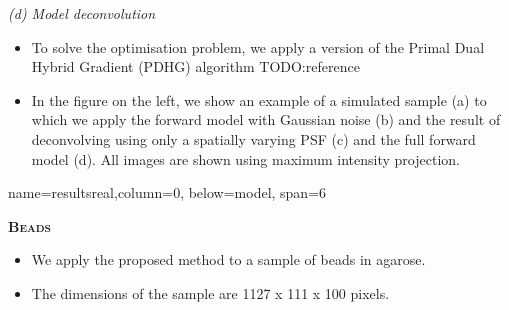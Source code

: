 \documentclass[a0paper,portrait,fontscale=0.35]{baposter}
\newcommand{\mycaption}[1]{
  {
    \smaller
    \emph{#1}
  }
}
\theoremstyle{plain}
\theoremstyle{plain}
\theoremstyle{definition}
\theoremstyle{plain}
\theoremstyle{definition}
\begin{document}
\begin{poster}
{\begin{minipage}[t]{0.55\textwidth}
\begin{minipage}[t]{0.49\textwidth}
        \vspace{0.3em}
        \mycaption{
          (d) Model deconvolution
        }
      \end{minipage}
    \end{minipage}
    \hspace{-0.5em}
    \begin{minipage}[t]{0.45\textwidth}
      \begin{itemize}
        \item To solve the optimisation problem, we apply a version
          of the Primal Dual Hybrid Gradient (PDHG) algorithm TODO:reference

        \item In the figure on the left, we show an example of a simulated sample (a) 
          to which we apply the forward model with Gaussian noise (b)
          and the result of deconvolving using only a spatially varying
          PSF (c) and the full forward model (d). All images are shown 
          using maximum intensity projection.
      \end{itemize}
    \end{minipage}
}

{name=resultsreal,column=0, below=model, span=6}{
  \begin{minipage}[t]{0.51\textwidth} 
    \begin{center}
      \larger
      \textbf{\textsc{Beads}}
    \end{center}

   \hspace{-2em}
    \begin{minipage}[t]{0.49\textwidth}
      \begin{itemize}
        \item We apply the proposed method to a sample of 
          beads in agarose.
        \item The dimensions of the sample are 1127 x 111 x 100 pixels.


\end{itemize}
\end{minipage}
\end{minipage}}
\end{poster}
\end{document}
